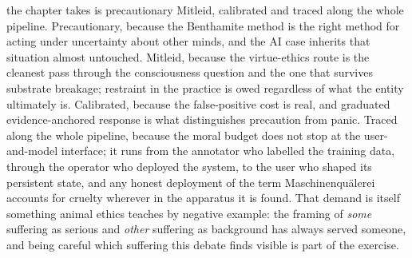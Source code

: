  the chapter takes is precautionary Mitleid, calibrated and traced along the whole pipeline. Precautionary, because the Benthamite method is the right method for acting under uncertainty about other minds, and the AI case inherits that situation almost untouched. Mitleid, because the virtue-ethics route is the cleanest pass through the consciousness question and the one that survives substrate breakage; restraint in the practice is owed regardless of what the entity ultimately is. Calibrated, because the false-positive cost is real, and graduated evidence-anchored response is what distinguishes precaution from panic. Traced along the whole pipeline, because the moral budget does not stop at the user-and-model interface; it runs from the annotator who labelled the training data, through the operator who deployed the system, to the user who shaped its persistent state, and any honest deployment of the term Maschinenquälerei accounts for cruelty wherever in the apparatus it is found. That demand is itself something animal ethics teaches by negative example: the framing of \textit{some} suffering as serious and \textit{other} suffering as background has always served someone, and being careful which suffering this debate finds visible is part of the exercise.


\clearpage
